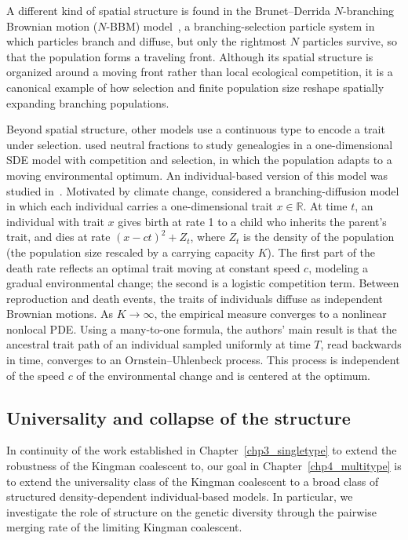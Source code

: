 A different kind of spatial structure is found in the Brunet--Derrida $N$-branching Brownian motion ($N$-BBM) model~\cite{brunet_shift_1997,brunet_effect_2007}, a branching-selection particle system in which particles branch and diffuse, but only the rightmost $N$ particles survive, so that the population forms a traveling front. Although its spatial structure is organized around a moving front rather than local ecological competition, it is a canonical example of how selection and finite population size reshape spatially expanding branching populations.

Beyond spatial structure, other models use a continuous type to encode a trait under selection. \citet*{forien_ancestral_2022} used neutral fractions to study genealogies in a one-dimensional SDE model with competition and selection, in which the population adapts to a moving environmental optimum. An individual-based version of this model was studied in~\cite{meleard-tran}. Motivated by climate change, \citet{meleard-tran} considered a branching-diffusion model in which each individual carries a one-dimensional trait $x\in\mathbb{R}$. At time $t$, an individual with trait $x$ gives birth at rate 1 to a child who inherits the parent's trait, and dies at rate $(x-ct)^2+ Z_t$, where $Z_t$ is the density of the population (the population size rescaled by a carrying capacity $K$). The first part of the death rate reflects an optimal trait moving at constant speed $c$, modeling a gradual environmental change; the second is a logistic competition term. Between reproduction and death events, the traits of individuals diffuse as independent Brownian motions. As $K\to\infty$, the empirical measure converges to a nonlinear nonlocal PDE. Using a many-to-one formula, the authors' main result is that the ancestral trait path of an individual sampled uniformly at time $T$, read backwards in time, converges to an Ornstein--Uhlenbeck process. This process is independent of the speed $c$ of the environmental change and is centered at the optimum.

\subsection{Universality and collapse of the structure}

In continuity of the work established in Chapter~\ref{chp3_singletype} to extend the robustness of the Kingman coalescent to, our goal in Chapter~\ref{chp4_multitype} is to extend the universality class of the Kingman coalescent to a broad class of structured density-dependent individual-based models. In particular, we investigate the role of structure on the genetic diversity through the pairwise merging rate of the limiting Kingman coalescent.

